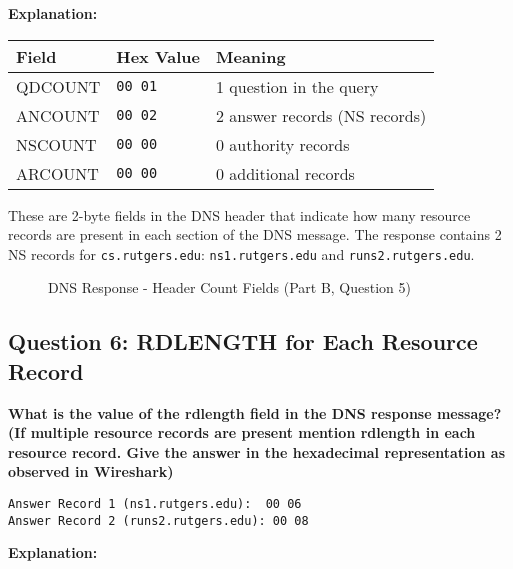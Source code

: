 \documentclass[11pt,letterpaper]{article}
\begin{document}
\textbf{Explanation:}

\begin{center}
\begin{tabular}{lll}
\toprule
\textbf{Field} & \textbf{Hex Value} & \textbf{Meaning} \\
\midrule
QDCOUNT & \texttt{00 01} & 1 question in the query \\
ANCOUNT & \texttt{00 02} & 2 answer records (NS records) \\
NSCOUNT & \texttt{00 00} & 0 authority records \\
ARCOUNT & \texttt{00 00} & 0 additional records \\
\bottomrule
\end{tabular}
\end{center}

These are 2-byte fields in the DNS header that indicate how many resource records are present in each section of the DNS message. The response contains 2 NS records for \texttt{cs.rutgers.edu}: \texttt{ns1.rutgers.edu} and \texttt{runs2.rutgers.edu}.

\begin{figure}[h]
    \centering
    \caption{DNS Response - Header Count Fields (Part B, Question 5)}
    \label{fig:partb_q5}
\end{figure}

\newpage

\subsection{Question 6: RDLENGTH for Each Resource Record}

\textbf{What is the value of the rdlength field in the DNS response message? (If multiple resource records are present mention rdlength in each resource record. Give the answer in the hexadecimal representation as observed in Wireshark)}

\begin{hexbox}
\begin{lstlisting}[style=hexstyle]
Answer Record 1 (ns1.rutgers.edu):  00 06
Answer Record 2 (runs2.rutgers.edu): 00 08
\end{lstlisting}
\end{hexbox}

\textbf{Explanation:}
\end{document}
